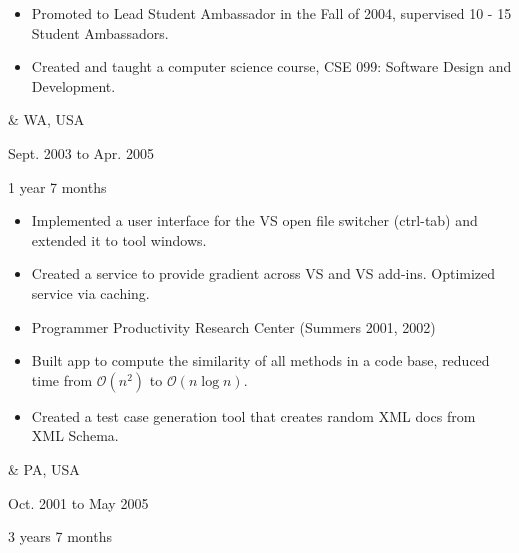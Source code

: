 \documentclass[10pt, letterpaper]{article}
\newenvironment{highlights}{
        \begin{itemize}[
                topsep=0pt,
                parsep=0.10 cm,
                partopsep=0pt,
                itemsep=0pt,
                after=\vspace{-1\baselineskip},
                leftmargin=0.4 cm + 3pt
            ]
    }{
        \end{itemize}
    } %
\let\originalTabularx\tabularx
\let\originalEndTabularx\endtabularx
\renewenvironment{tabularx}{\bgroup\centering\originalTabularx}{\originalEndTabularx\par\egroup}
\begin{document}
        \vspace{0.2 cm}
        \begin{tabularx}{
            \textwidth-0.4 cm-0.13cm
        }{
            K{0.2 cm}
            R{4.1 cm}
        }
            \textbf{}

            \vspace{0.10 cm}

            \begin{highlights}
                \item Promoted to Lead Student Ambassador in the Fall of 2004, supervised 10 - 15 Student Ambassadors.
                \item Created and taught a computer science course, CSE 099: Software Design and Development.
            \end{highlights}
            &
            WA, USA

        Sept. 2003 to Apr. 2005

        1 year 7 months
        \end{tabularx}


        \vspace{0.2 cm}
        \begin{tabularx}{
            \textwidth-0.4 cm-0.13cm
        }{
            K{0.2 cm}
            R{4.1 cm}
        }
            \textbf{}

            \vspace{0.10 cm}

            \begin{highlights}
                \item Implemented a user interface for the VS open file switcher (ctrl-tab) and extended it to tool windows.
                \item Created a service to provide gradient across VS and VS add-ins. Optimized service via caching.
                \item Programmer Productivity Research Center (Summers 2001, 2002)
                \item Built app to compute the similarity of all methods in a code base, reduced time from $\mathcal{O}(n^2)$ to $\mathcal{O}(n \log n)$. 
                \item Created a test case generation tool that creates random XML docs from XML Schema.
            \end{highlights}
            &
            PA, USA

        Oct. 2001 to May 2005

        3 years 7 months
        \end{tabularx}
\end{document}
